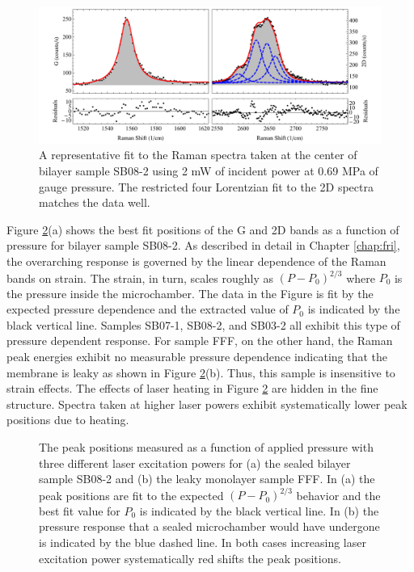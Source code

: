 \begin{figure}
	\begin{center}
	\includegraphics[scale=0.6]{Figs_Thermal/0_3mW.pdf}
	\end{center}
	\caption[Representative fit to Raman spectra for thermal conductivity measurements]{\label{fig:therm:spec}
		A representative fit to the Raman spectra taken at the center of bilayer sample SB08-2 using 2 mW of incident power at 0.69 MPa of gauge pressure.
		The restricted four Lorentzian fit to the 2D spectra matches the data well.
	}
\end{figure}

Figure \ref{fig:therm:PeakPressure}(a) shows the best fit positions of the G and 2D bands as a function of pressure for bilayer sample SB08-2.
As described in detail in Chapter \ref{chap:fri}, the overarching response is governed by the linear dependence of the Raman bands on strain.
The strain, in turn, scales roughly as $(P-P_0)^{2/3}$ where $P_0$ is the pressure inside the microchamber.
The data in the Figure is fit by the expected pressure dependence and the extracted value of $P_0$ is indicated by the black vertical line.
Samples SB07-1, SB08-2, and SB03-2 all exhibit this type of pressure dependent response.
For sample FFF, on the other hand, the Raman peak energies exhibit no measurable pressure dependence indicating that the membrane is leaky as shown in Figure \ref{fig:therm:PeakPressure}(b).
Thus, this sample is insensitive to strain effects.
The effects of laser heating in Figure \ref{fig:therm:PeakPressure} are hidden in the fine structure.
Spectra taken at higher laser powers exhibit systematically lower peak positions due to heating.

\begin{figure}
	\begin{center}
	
	\end{center}
	\caption[Pressure dependent peak positions]{\label{fig:therm:PeakPressure}
		The peak positions measured as a function of applied pressure with three different laser excitation powers for (a) the sealed bilayer sample SB08-2 and (b) the leaky monolayer sample FFF.
		In (a) the peak positions are fit to the expected $(P-P_0)^{2/3}$ behavior and the best fit value for $P_0$ is indicated by the black vertical line.
		In (b) the pressure response that a sealed microchamber would have undergone is indicated by the blue dashed line.
		In both cases increasing laser excitation power systematically red shifts the peak positions.
	}
\end{figure}

